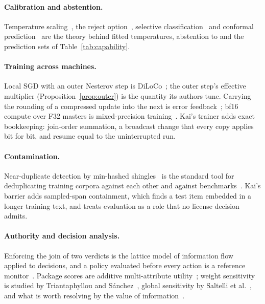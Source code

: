 \paragraph{Calibration and abstention.}
Temperature scaling~\cite{guo2017}, the reject option~\cite{chow1970},
selective classification~\cite{geifman2017} and conformal
prediction~\cite{vovk2005} are the theory behind fitted temperatures,
abstention to \ask{} and the prediction sets of Table~\ref{tab:capability}.

\paragraph{Training across machines.}
Local SGD with an outer Nesterov step is DiLoCo~\cite{douillard2023diloco}; the
outer step's effective multiplier (Proposition~\ref{prop:outer}) is the
quantity its authors tune. Carrying the rounding of a compressed update into
the next is error feedback~\cite{seide2014onebit,karimireddy2019ef}; bf16
compute over F32 masters is mixed-precision training~\cite{micikevicius2018mixed}.
Kai's trainer adds exact bookkeeping: join-order summation, a broadcast change
that every copy applies bit for bit, and resume equal to the uninterrupted run.

\paragraph{Contamination.}
Near-duplicate detection by min-hashed shingles~\cite{broder1997resemblance} is
the standard tool for deduplicating training corpora against each other and
against benchmarks~\cite{lee2022dedup}. Kai's barrier adds sampled-span
containment, which finds a test item embedded in a longer training text, and
treats evaluation as a role that no license decision admits.

\paragraph{Authority and decision analysis.}
Enforcing the join of two verdicts is the lattice model of information
flow~\cite{denning1976} applied to decisions, and a policy evaluated before
every action is a reference monitor~\cite{anderson1972}. Package scores are
additive multi-attribute utility~\cite{keeney1976}; weight sensitivity is
studied by Triantaphyllou and S\'anchez~\cite{triantaphyllou1997}, global
sensitivity by Saltelli et al.~\cite{saltelli2008}, and what is worth
resolving by the value of information~\cite{howard1966}.
